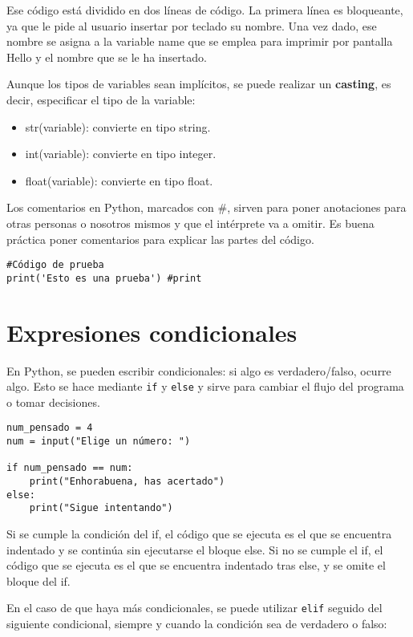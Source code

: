 Ese código está dividido en dos líneas de código. La primera línea es bloqueante, ya que le pide al usuario insertar por teclado su nombre. Una vez dado, ese nombre se asigna a la variable name que se emplea para imprimir por pantalla Hello y el nombre que se le ha insertado. 

Aunque los tipos de variables sean implícitos, se puede realizar un \textbf{casting}, es decir, especificar el tipo de la variable:
\begin{itemize}
\item str(variable): convierte en tipo string.
\item int(variable): convierte en tipo integer.
\item float(variable): convierte en tipo float.
\end{itemize}

Los comentarios en Python, marcados con \#, sirven para poner anotaciones para otras personas o nosotros mismos y que el intérprete va a omitir. Es buena práctica poner comentarios para explicar las partes del código.

\begin{lstlisting}
#Código de prueba
print('Esto es una prueba') #print
\end{lstlisting}

\section{Expresiones condicionales}
En Python, se pueden escribir condicionales: si algo es verdadero/falso, ocurre algo. Esto se hace mediante \texttt{if} y \texttt{else} y sirve para cambiar el flujo del programa o tomar decisiones.

\begin{lstlisting}
num_pensado = 4
num = input("Elige un número: ")

if num_pensado == num:
	print("Enhorabuena, has acertado")
else:
	print("Sigue intentando")
\end{lstlisting}

Si se cumple la condición del if, el código que se ejecuta es el que se encuentra indentado y se continúa sin ejecutarse el bloque else. Si no se cumple el if, el código que se ejecuta es el que se encuentra indentado tras else, y se omite el bloque del if. 

En el caso de que haya más condicionales, se puede utilizar \texttt{elif} seguido del siguiente condicional, siempre y cuando la condición sea de verdadero o falso:

